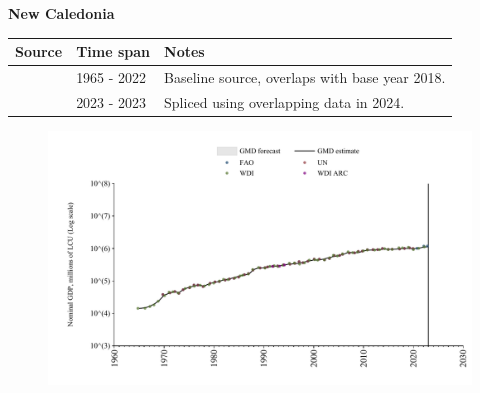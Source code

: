 \documentclass[12pt,a4paper,landscape]{article}
\begin{document}
\begin{adjustbox}{max totalsize={\paperwidth}{\paperheight},center}
\begin{minipage}[t][\textheight][t]{\textwidth}
\vspace*{0.5cm}
{}
\begin{center}
{\Large\bfseries New Caledonia}
\end{center}
\vspace{0.5cm}
\begin{table}[H]
\centering
\small
\begin{tabular}{|l|l|l|}
\hline
\textbf{Source} & \textbf{Time span} & \textbf{Notes} \\
\hline
\rowcolor{white}\cite{WDI}& 1965 - 2022 &Baseline source, overlaps with base year 2018.\\
\rowcolor{lightgray}\cite{FAO}& 2023 - 2023 &Spliced using overlapping data in 2024.\\
\hline
\end{tabular}
\end{table}
\begin{figure}[H]
\centering
\includegraphics[width=\textwidth,height=0.6\textheight,keepaspectratio]{graphs/NCL_nGDP.pdf}
\end{figure}
\end{minipage}
\end{adjustbox}
\end{document}
